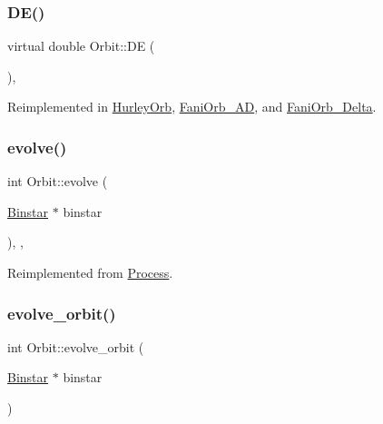 \subsubsection{\texorpdfstring{D\+E()}{DE()}}
{\footnotesize\ttfamily virtual double Orbit\+::\+DE (\begin{DoxyParamCaption}{ }\end{DoxyParamCaption})\hspace{0.3cm}{\ttfamily [inline]}, {\ttfamily [virtual]}}



Reimplemented in \hyperlink{class_hurley_orb_ad0c599c31dad0585d007c08eb22cbc89}{Hurley\+Orb}, \hyperlink{class_fani_orb___a_d_a143c3e6457bed241959abb5c939237ac}{Fani\+Orb\+\_\+\+AD}, and \hyperlink{class_fani_orb___delta_a24ebee89e909be8bdfee96614d88304c}{Fani\+Orb\+\_\+\+Delta}.

\mbox{\label{class_orbit_a772b9fe9a4718147236f4cb52cf268da}} 
\subsubsection{\texorpdfstring{evolve()}{evolve()}}
{\footnotesize\ttfamily int Orbit\+::evolve (\begin{DoxyParamCaption}\item[{\hyperlink{class_binstar}{Binstar} $\ast$}]{binstar }\end{DoxyParamCaption})\hspace{0.3cm}{\ttfamily [inline]}, {\ttfamily [override]}, {\ttfamily [virtual]}}



Reimplemented from \hyperlink{class_process_ab8729b32bb73a12bbe4e481f661213f9}{Process}.

\mbox{\label{class_orbit_a618bf7f4226380f7b483343734aa347e}} 
\subsubsection{\texorpdfstring{evolve\+\_\+orbit()}{evolve\_orbit()}}
{\footnotesize\ttfamily int Orbit\+::evolve\+\_\+orbit (\begin{DoxyParamCaption}\item[{\hyperlink{class_binstar}{Binstar} $\ast$}]{binstar }\end{DoxyParamCaption})}

